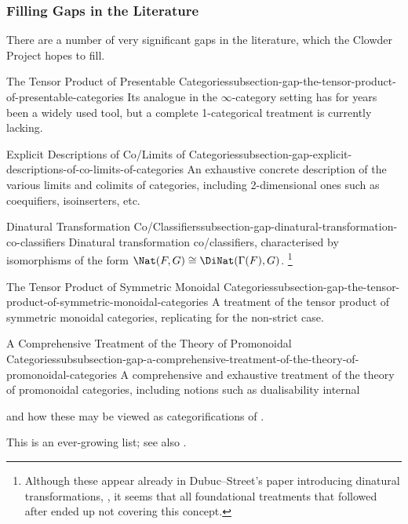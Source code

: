 \subsubsection{Filling Gaps in the Literature}\label{subsubsection-filling-gaps-in-the-literature}
There are a number of very significant gaps in the literature, which the Clowder Project hopes to fill.
\begin{gap}{The Tensor Product of Presentable Categories}{subsection-gap-the-tensor-product-of-presentable-categories}%
    Its analogue in the $\infty$-category setting has for years been a widely used tool, but a complete 1-categorical treatment is currently lacking.
\end{gap}
\begin{gap}{Explicit Descriptions of Co/Limits of Categories}{subsection-gap-explicit-descriptions-of-co-limits-of-categories}%
    An exhaustive concrete description of the various limits and colimits of categories, including 2-dimensional ones such as coequifiers, isoinserters, etc.
\end{gap}
\begin{gap}{Dinatural Transformation Co/Classifiers}{subsection-gap-dinatural-transformation-co-classifiers}%
    Dinatural transformation co/classifiers, characterised by isomorphisms of the form $\Nat(F,G)\cong\DiNat(\Gamma(F),G)$.%
    \footnote{%
        Although these appear already in Dubuc--Street's paper introducing dinatural transformations, \cite{dubuc-street-dinatural-transformations}, it seems that all foundational treatments that followed after ended up not covering this concept.
    }%
\end{gap}
\begin{gap}{The Tensor Product of Symmetric Monoidal Categories}{subsection-gap-the-tensor-product-of-symmetric-monoidal-categories}%
    A treatment of the tensor product of symmetric monoidal categories, replicating \cite{the-symmetric-monoidal-2-category-of-permutative-categories} for the non-strict case.
\end{gap}
\begin{gap}{A Comprehensive Treatment of the Theory of Promonoidal Categories}{subsubsection-gap-a-comprehensive-treatment-of-the-theory-of-promonoidal-categories}%
    A comprehensive and exhaustive treatment of the theory of promonoidal categories, including notions such as dualisability internal

    and how these may be viewed as categorifications of .
\end{gap}
This is an ever-growing list; see also \cite{MO494959}.

